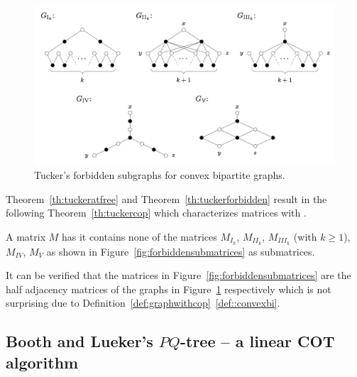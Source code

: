 \begin{figure}[htbp]
  \centering
  \includegraphics[scale=0.35]{../img/tuckersforbiddensubgraphs.png}  
  \caption[\figtabsize Tucker's forbidden subgraphs]{\figtabsize Tucker's
    forbidden subgraphs for convex bipartite graphs. } 
  \label{fig:forbiddensubgraphs}
\end{figure}

Theorem~\ref{th:tuckeratfree} and Theorem~\ref{th:tuckerforbidden}
result in the following Theorem~\ref{th:tuckercop} which characterizes
matrices with \COP.

\begin{theoremsansproof}
  A matrix $M$ has \COP \iff it contains none of the matrices 
$M_{I_k}$, $M_{II_k}$, $M_{III_k}$ (with $k \ge 1$), $M_{IV}$,
  $M_{V}$ as shown in Figure~\ref{fig:forbiddensubmatrices} as submatrices.
  \label{th:tuckercop}
\end{theoremsansproof}

\figforbiddensubmatrices

It can be verified that the matrices in
Figure~\ref{fig:forbiddensubmatrices} are the half adjacency matrices
of the graphs in Figure~\ref{fig:forbiddensubgraphs} respectively
which is not surprising due to
Definition~\ref{def:graphwithcop}~\ref{def::convexbi}.

\subsection{Booth and Lueker's $PQ$-tree -- a linear COT algorithm} %

